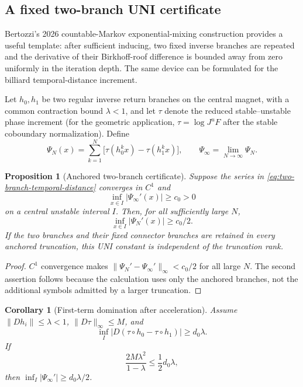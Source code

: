 \documentclass[11pt]{article}
\newtheorem{proposition}[theorem]{Proposition}
\newtheorem{corollary}[theorem]{Corollary}
\begin{document}
\subsection{A fixed two-branch UNI certificate}

Bertozzi's 2026 countable-Markov exponential-mixing construction provides a
useful template: after sufficient inducing, two fixed inverse branches are
repeated and the derivative of their Birkhoff-roof difference is bounded away
from zero uniformly in the iteration depth.  The same device can be formulated
for the billiard temporal-distance increment.

Let $h_0,h_1$ be two regular inverse return branches on the central magnet,
with a common contraction bound $\lambda<1$, and let $\tau$ denote the
reduced stable--unstable phase increment (for the geometric application,
$\tau=\log J^uF$ after the stable coboundary normalization).  Define
\begin{equation}
\label{eq:two-branch-temporal-distance}
 \Psi_N(x)=\sum_{k=1}^N
 \bigl[\tau(h_0^kx)-\tau(h_1^kx)\bigr],
 \qquad
 \Psi_\infty=\lim_{N\to\infty}\Psi_N .
\end{equation}

\begin{proposition}[Anchored two-branch certificate]
\label{prop:two-branch-uni}
Suppose the series in \eqref{eq:two-branch-temporal-distance} converges in
$C^1$ and
\[
 \inf_{x\in I}|\Psi_\infty'(x)|\ge c_0>0
\]
on a central unstable interval $I$.  Then, for all sufficiently large $N$,
\[
 \inf_{x\in I}|\Psi_N'(x)|\ge c_0/2.
\]
If the two branches and their fixed connector branches are retained in every
anchored truncation, this UNI constant is independent of the truncation rank.
\end{proposition}

\begin{proof}
$C^1$ convergence makes
$\|\Psi_N'-\Psi_\infty'\|_\infty<c_0/2$ for all large $N$.  The second
assertion follows because the calculation uses only the anchored branches,
not the additional symbols admitted by a larger truncation.
\end{proof}

\begin{corollary}[First-term domination after acceleration]
\label{cor:first-term-uni}
Assume $\|Dh_i\|\le\lambda<1$, $\|D\tau\|_\infty\le M$, and
\[
 \inf_I|D(\tau\circ h_0-\tau\circ h_1)|\ge d_0\lambda .
\]
If
\[
 \frac{2M\lambda^2}{1-\lambda}\le\frac12d_0\lambda,
\]
then $\inf_I|\Psi_\infty'|\ge d_0\lambda/2$.
\end{corollary}
\end{document}
